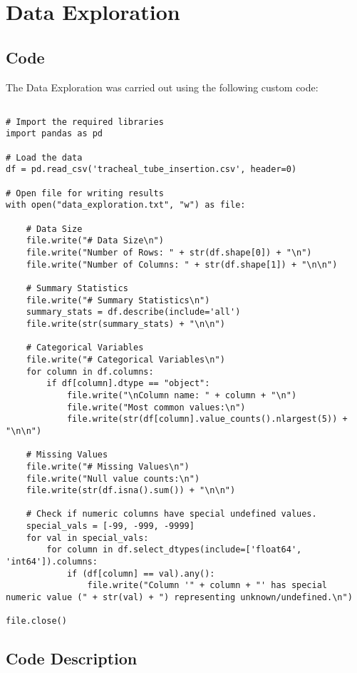\documentclass[11pt]{article}
\begin{document}
\section{Data Exploration}
\subsection{{Code}}
The Data Exploration was carried out using the following custom code:

\begin{verbatim}

# Import the required libraries
import pandas as pd

# Load the data
df = pd.read_csv('tracheal_tube_insertion.csv', header=0)

# Open file for writing results
with open("data_exploration.txt", "w") as file:
    
    # Data Size
    file.write("# Data Size\n")
    file.write("Number of Rows: " + str(df.shape[0]) + "\n")
    file.write("Number of Columns: " + str(df.shape[1]) + "\n\n")

    # Summary Statistics
    file.write("# Summary Statistics\n")
    summary_stats = df.describe(include='all')
    file.write(str(summary_stats) + "\n\n")

    # Categorical Variables
    file.write("# Categorical Variables\n")
    for column in df.columns:
        if df[column].dtype == "object":
            file.write("\nColumn name: " + column + "\n")
            file.write("Most common values:\n")
            file.write(str(df[column].value_counts().nlargest(5)) + "\n\n")

    # Missing Values
    file.write("# Missing Values\n")
    file.write("Null value counts:\n")
    file.write(str(df.isna().sum()) + "\n\n")

    # Check if numeric columns have special undefined values.
    special_vals = [-99, -999, -9999]
    for val in special_vals:
        for column in df.select_dtypes(include=['float64', 'int64']).columns:
            if (df[column] == val).any():
                file.write("Column '" + column + "' has special numeric value (" + str(val) + ") representing unknown/undefined.\n")
                
file.close()

\end{verbatim}

\subsection{Code Description}
\end{document}

